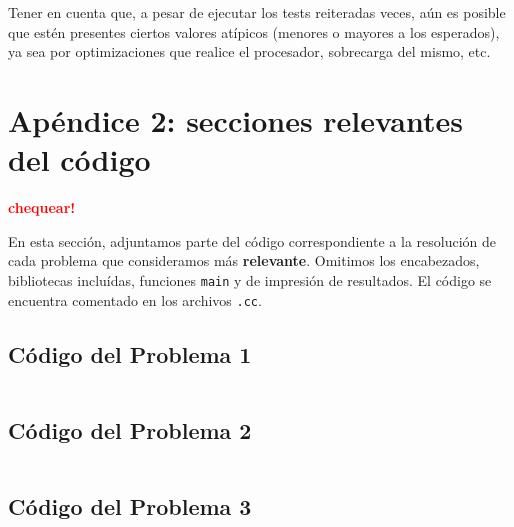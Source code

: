 \documentclass[a4paper]{article}
\begin{document}
Tener en cuenta que, a pesar de ejecutar los tests reiteradas veces, aún es posible que estén presentes ciertos
valores atípicos (menores o mayores a los esperados), ya sea por optimizaciones que realice el procesador, sobrecarga
del mismo, etc.
\newpage

\section{Apéndice 2: secciones relevantes del código}

\textcolor{red}{\textbf{chequear!}} \medskip

En esta sección, adjuntamos parte del código correspondiente a la resolución de cada problema
que consideramos más \textbf{relevante}. Omitimos los encabezados, bibliotecas incluídas,
funciones \verb|main| y de impresión de resultados. El código se encuentra comentado en los
archivos \verb|.cc|.

\subsection{Código del Problema 1}


\begin{lstlisting}
\end{lstlisting}

\vspace*{0.5cm}


\newpage


\subsection{Código del Problema 2}


\begin{lstlisting}
\end{lstlisting}

\vspace*{0.5cm}


\newpage


\subsection{Código del Problema 3}


\begin{lstlisting}
\end{lstlisting}

\vspace*{0.5cm}
\end{document}

